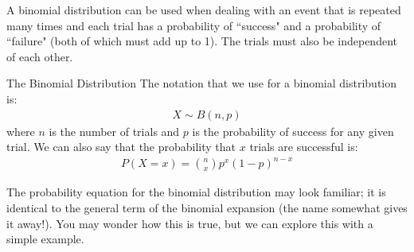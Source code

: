 \documentclass[../../main.tex]{subfiles}
\begin{document}
A binomial distribution can be used when dealing with an event that is repeated many times and each trial has a probability of ``success" and a probability of ``failure" (both of which must add up to 1). The trials must also be independent of each other.
\begin{theorem}{The Binomial Distribution}
The notation that we use for a binomial distribution is:
\begin{align}
    X \sim B(n, p)
\end{align}
where $n$ is the number of trials and $p$ is the probability of success for any given trial. We can also say that the probability that $x$ trials are successful is:
\begin{align}
    P(X=x) = \binom{n}{x}p^x(1-p)^{n-x}
\end{align}
\end{theorem}

The probability equation for the binomial distribution may look familiar; it is identical to the general term of the binomial expansion (the name somewhat gives it away!). You may wonder how this is true, but we can explore this with a simple example.
\end{document}
